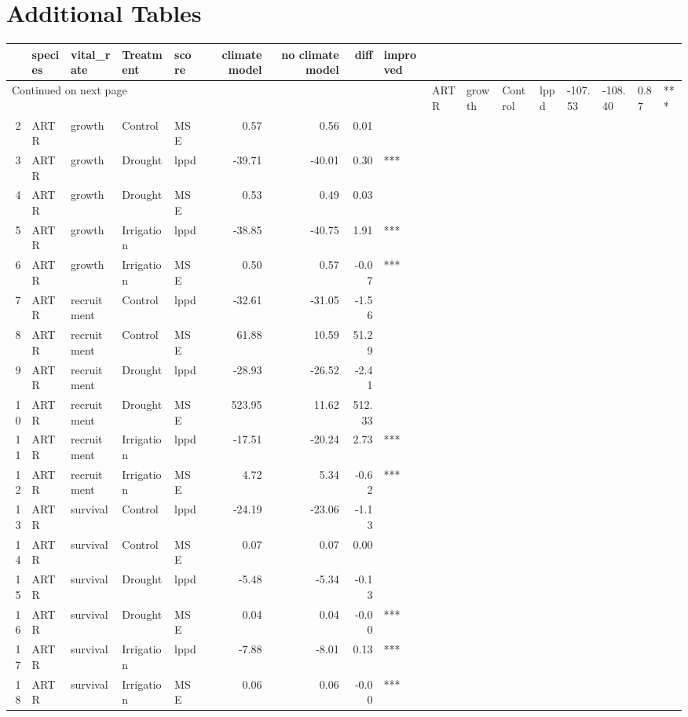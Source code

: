 \documentclass[11pt]{article}
\begin{document}
\section{Additional Tables} 
\begin{longtable}{rllllrrrl}
	\hline
	& species & vital\_rate & Treatment & score & climate model & no climate model & diff & improved \\ 
	\hline
	\endhead
	\hline
	\multicolumn{9}{l}{\footnotesize Continued on next page}
	\endfoot
	\endlastfoot
	1 & ARTR & growth & Control & lppd & -107.53 & -108.40 & 0.87 & *** \\ 
	2 & ARTR & growth & Control & MSE & 0.57 & 0.56 & 0.01 &  \\ 
	3 & ARTR & growth & Drought & lppd & -39.71 & -40.01 & 0.30 & *** \\ 
	4 & ARTR & growth & Drought & MSE & 0.53 & 0.49 & 0.03 &  \\ 
	5 & ARTR & growth & Irrigation & lppd & -38.85 & -40.75 & 1.91 & *** \\ 
	6 & ARTR & growth & Irrigation & MSE & 0.50 & 0.57 & -0.07 & *** \\ 
	7 & ARTR & recruitment & Control & lppd & -32.61 & -31.05 & -1.56 &  \\ 
	8 & ARTR & recruitment & Control & MSE & 61.88 & 10.59 & 51.29 &  \\ 
	9 & ARTR & recruitment & Drought & lppd & -28.93 & -26.52 & -2.41 &  \\ 
	10 & ARTR & recruitment & Drought & MSE & 523.95 & 11.62 & 512.33 &  \\ 
	11 & ARTR & recruitment & Irrigation & lppd & -17.51 & -20.24 & 2.73 & *** \\ 
	12 & ARTR & recruitment & Irrigation & MSE & 4.72 & 5.34 & -0.62 & *** \\ 
	13 & ARTR & survival & Control & lppd & -24.19 & -23.06 & -1.13 &  \\ 
	14 & ARTR & survival & Control & MSE & 0.07 & 0.07 & 0.00 &  \\ 
	15 & ARTR & survival & Drought & lppd & -5.48 & -5.34 & -0.13 &  \\ 
	16 & ARTR & survival & Drought & MSE & 0.04 & 0.04 & -0.00 & *** \\ 
	17 & ARTR & survival & Irrigation & lppd & -7.88 & -8.01 & 0.13 & *** \\ 
	18 & ARTR & survival & Irrigation & MSE & 0.06 & 0.06 & -0.00 & *** \\ 

\end{longtable}
\end{document}

